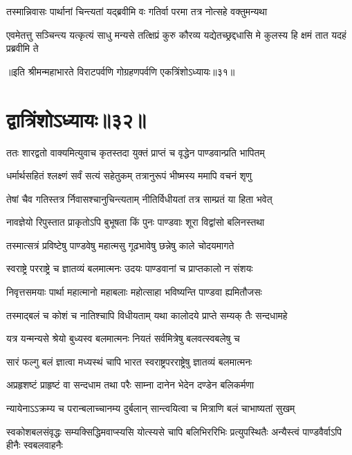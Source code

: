 \twolineshloka
{तस्मान्निवासः पार्थानां चिन्त्यतां यद्ब्रवीमि वः}
{गतिर्वा परमा तत्र नोत्सहे वक्तुमन्यथा}


\threelineshloka
{एवमेतत्तु सञ्चिन्त्य यत्कृत्यं साधु मन्यसे}
{तत्क्षिप्रं कुरु कौरव्य यद्येतच्छ्रद्दधासि मे}
{कुलस्य हि क्षमं तात यदहं प्रब्रवीमि ते}

॥इति श्रीमन्महाभारते विराटपर्वणि गोग्रहणपर्वणि एकत्रिंशोऽध्यायः॥३१॥

\chapter{द्वात्रिंशोऽध्यायः॥३२॥}

\twolineshloka
{ततः शारद्वतो वाक्यमित्युवाच कृतस्तदा}
{युक्तं प्राप्तं च वृद्धेन पाण्डवान्प्रति भापितम्}


\twolineshloka
{धर्मार्थसहितं श्लक्ष्णं सर्वं सत्यं सहेतुकम्}
{तत्रानुरूपं भीष्मस्य ममापि वचनं शृणु}


\twolineshloka
{तेषां चैव गतिस्तत्र र्निवासश्चानुचिन्त्यताम्}
{नीतिर्विधीयतां तत्र साम्प्रतं या हिता भवेत्}


\twolineshloka
{नावज्ञेयो रिपुस्तात प्राकृतोऽपि बुभूषता}
{किं पुनः पाण्डवाः शूरा विद्वांसो बलिनस्तथा}


\twolineshloka
{तस्मात्सत्रं प्रविष्टेषु पाण्डवेषु महात्मसु}
{गूढभावेषु छन्नेषु काले चोदयमागते}


\twolineshloka
{स्वराष्ट्रे परराष्ट्रे च ज्ञातव्यं बलमात्मनः}
{उदयः पाण्डवानां च प्राप्तकालो न संशयः}


\twolineshloka
{निवृत्तसमयाः पार्था महात्मानो महाबलाः}
{महोत्साहा भविष्यन्ति पाण्डवा ह्यमितौजसः}


\twolineshloka
{तस्माद्बलं च कोशं च नातिश्चापि विधीयताम्}
{यथा कालोदये प्राप्ते सम्यक् तैः सन्दधामहे}


\twolineshloka
{यत्र यन्मन्यसे श्रेयो बुध्यस्व बलमात्मनः}
{नियतं सर्वमित्रेषु बलवत्स्वबलेषु च}


\twolineshloka
{सारं फल्गु बलं ज्ञात्वा मध्यस्थं चापि भारत}
{स्वराष्ट्रपरराष्ट्रेषु ज्ञातव्यं बलमात्मनः}


\twolineshloka
{अप्रहृशष्टं प्राहृष्टं वा सन्दधाम तथा परैः}
{साम्ना दानेन भेदेन दण्डेन बलिकर्मणा}


\twolineshloka
{न्यायेनाऽऽक्रम्य च परान्बलाच्चानम्य दुर्बलान्}
{सान्त्वयित्वा च मित्राणि बलं चाभाष्यतां सुखम्}


\threelineshloka
{स्वकोशबलसंवृद्धः सम्यक्सिद्धिमवाप्स्यसि}
{योत्स्यसे चापि बलिभिररिभिः प्रत्युपस्थितैः}
{अन्यैस्त्वं पाण्डवैर्वाऽपि हीनैः स्वबलवाहनैः}


